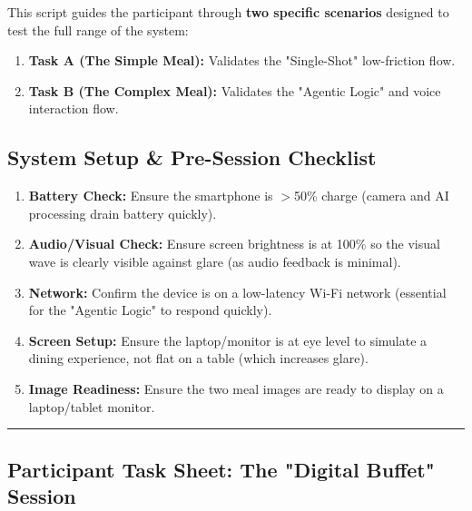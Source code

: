 \label{app:task_script}

This script guides the participant through \textbf{two specific scenarios} designed to test the full range of the system:

\begin{enumerate}
    \item \textbf{Task A (The Simple Meal):} Validates the "Single-Shot" low-friction flow.
    \item \textbf{Task B (The Complex Meal):} Validates the "Agentic Logic" and voice interaction flow.
\end{enumerate}

\subsection*{System Setup \& Pre-Session Checklist}
\begin{enumerate}
    \item \textbf{Battery Check:} Ensure the smartphone is $>$50\% charge (camera and AI processing drain battery quickly).
    \item \textbf{Audio/Visual Check:} Ensure screen brightness is at 100\% so the visual wave is clearly visible against glare (as audio feedback is minimal).
    \item \textbf{Network:} Confirm the device is on a low-latency Wi-Fi network (essential for the "Agentic Logic" to respond quickly).
    \item \textbf{Screen Setup:} Ensure the laptop/monitor is at eye level to simulate a dining experience, not flat on a table (which increases glare).
    \item \textbf{Image Readiness:} Ensure the two meal images are ready to display on a laptop/tablet monitor.
\end{enumerate}
\vspace{1em}
\hrule
\vspace{1em}

\subsection*{Participant Task Sheet: The "Digital Buffet" Session}

